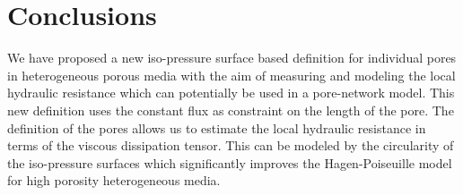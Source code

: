 \documentclass[draft]{agujournal2019}
\begin{document}
\section{Conclusions}
We have proposed a new iso-pressure surface based definition for individual pores in heterogeneous porous media with the aim of measuring and modeling the local hydraulic resistance which can potentially be used in a pore-network model. This new definition uses the constant flux as constraint on the length of the pore. The definition of the pores allows us to estimate the local hydraulic resistance in terms of the viscous dissipation tensor. This can be modeled by the circularity of the iso-pressure surfaces which significantly improves the Hagen-Poiseuille model for high porosity heterogeneous media. 









\end{document}
